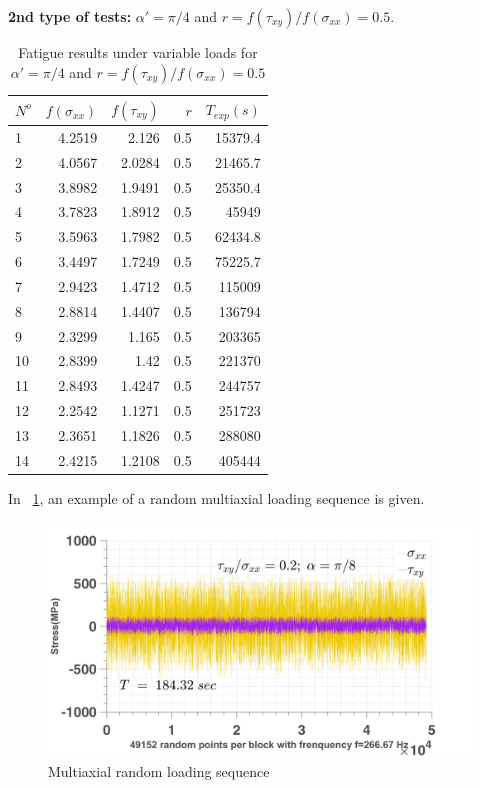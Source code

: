 \documentclass[3p,times,number,review]{elsarticle}
\newcommand{\figref}[1]{\figurename~\ref{#1}}
\begin{document}
\textbf{2nd type of tests:} $\alpha' = \pi / 4$ and $r =f(\tau_{xy})/f(\sigma_{xx})=0.5$.

\begin{table}[]
\centering
\begin{tabular}{lrrrr}
\hline
$N^o$ & $f(\sigma_{xx})$ & $f(\tau_{xy})$ & $r$   & $T_{exp}(s)$ \\ \hline
1   & 4.2519                  & 2.126   & 0.5 & 15379.4    \\
2   & 4.0567                  & 2.0284  & 0.5 & 21465.7    \\
3   & 3.8982                  & 1.9491  & 0.5 & 25350.4    \\
4   & 3.7823                  & 1.8912  & 0.5 & 45949      \\
5   & 3.5963                  & 1.7982  & 0.5 & 62434.8    \\
6   & 3.4497                  & 1.7249  & 0.5 & 75225.7    \\
7   & 2.9423                  & 1.4712  & 0.5 & 115009     \\
8   & 2.8814                  & 1.4407  & 0.5 & 136794     \\
9   & 2.3299                  & 1.165   & 0.5 & 203365     \\
10  & 2.8399                  & 1.42    & 0.5 & 221370     \\
11  & 2.8493                  & 1.4247  & 0.5 & 244757     \\
12  & 2.2542                  & 1.1271  & 0.5 & 251723     \\
13  & 2.3651                  & 1.1826  & 0.5 & 288080     \\
14  & 2.4215                  & 1.2108  & 0.5 & 405444     \\ \hline
\end{tabular}
\caption{Fatigue results under variable loads for $\alpha' = \pi / 4$ and $r =f(\tau_{xy})/f(\sigma_{xx})=0.5$}
\label{tab.10HNAPrand2}
\end{table}

In \figref{fig.10HNAP2Drandom}, an example of a random multiaxial loading sequence is given.
\begin{figure}[!h]
\centering
\includegraphics[width=\textwidth]{figures//HNAP_random.png} 
\caption{Multiaxial random loading sequence}
\label{fig.10HNAP2Drandom}
\end{figure}
\end{document}
